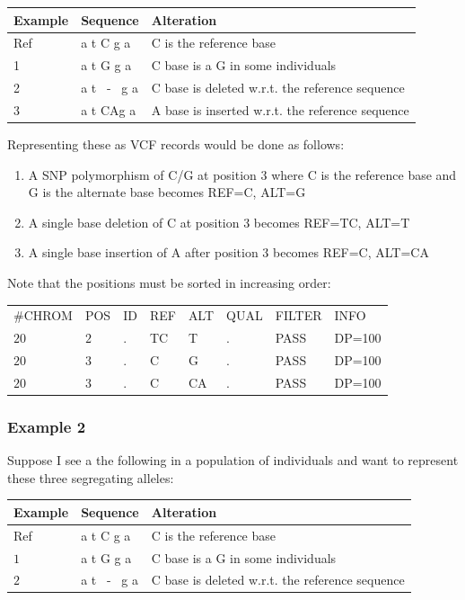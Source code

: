 \documentclass[8pt]{article}
\begin{document}
\vspace{0.3cm}
\begin{tabular}{ | l | l | l | }
\hline
Example & Sequence & Alteration \\ \hline
Ref & a t C g a & C is the reference base \\ \hline
1   & a t G g a & C base is a G in some individuals \\ \hline
2   & a t \ - \ g a & C base is deleted w.r.t. the reference sequence\\ \hline
3   & a t CAg a & A base is inserted w.r.t. the reference sequence \\ \hline
\end{tabular}
\vspace{0.3cm}

Representing these as VCF records would be done as follows:
\begin{enumerate}
  \item A SNP polymorphism of C/G at position 3 where C is the reference base and G is the alternate base becomes REF=C, ALT=G
  \item A single base deletion of C at position 3 becomes REF=TC, ALT=T
  \item A single base insertion of A after position 3 becomes REF=C, ALT=CA
\end{enumerate}

Note that the positions must be sorted in increasing order:

\vspace{0.5em}
\begin{tabular}{ l l l l l l l l}
	\#CHROM & POS & ID & REF & ALT & QUAL & FILTER & INFO \\
	$20$ & $2$ & . & TC & T & . & PASS & DP=100 \\
	$20$ & $3$ & . & C & G & . & PASS & DP=100 \\
	$20$ & $3$ & . & C & CA & . & PASS & DP=100 \\
\end{tabular}

\subsubsection{Example 2}
Suppose I see a the following in a population of individuals and want to represent these three segregating alleles:

\vspace{0.3cm}
\begin{tabular}{ | l | l | l | }
\hline
Example & Sequence & Alteration \\ \hline
Ref & a t C g a & C is the reference base \\ \hline
$1$   & a t G g a & C base is a G in some individuals \\ \hline
$2$   & a t \ - \ g a & C base is deleted w.r.t. the reference sequence \\ \hline
\end{tabular}
\vspace{0.3cm}
\end{document}
